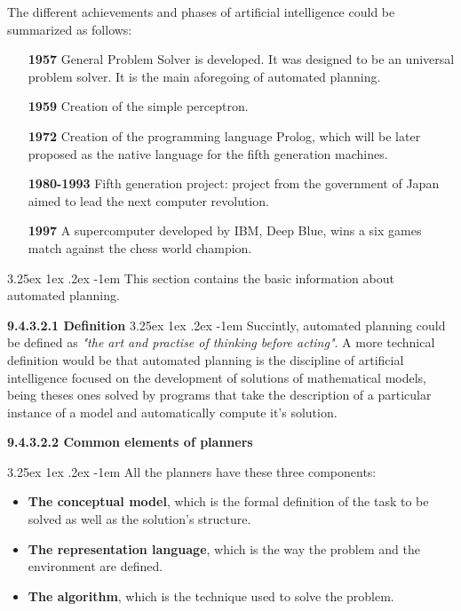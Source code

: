 \documentclass{article}
\makeatletter
\newcounter{subsubsubsection}
\renewcommand\paragraph{\@startsection{paragraph}{5}{\z@}%
      {3.25ex \@plus1ex \@minus.2ex}%
      {-1em}%
      {\normalfont\normalsize\bfseries}}
\makeatother
\begin{document}
    The different achievements and phases of artificial intelligence could be summarized as follows:
    
    \begin{itemize}
        \item[\textbf{1957}] General Problem Solver is developed. It was designed to be an universal problem solver. It is the main aforegoing of automated planning.
        \item[\textbf{1959}] Creation of the simple perceptron.
        \item[\textbf{1972}] Creation of the programming language Prolog, which will be later proposed as the native language for the fifth generation machines.
        \item[\textbf{1980-1993}] Fifth generation project: project from the government of Japan aimed to lead the next computer revolution.
        \item[\textbf{1997}] A supercomputer developed by IBM, Deep Blue, wins a six games match against the chess world champion.
    \end{itemize}
    
    
    \paragraph{}
    This section contains the basic information about automated planning.
    
    \textbf{9.4.3.2.1 Definition}
    \paragraph{}
    Succintly, automated planning could be defined as \textit{"the art and practise of thinking before acting"}. A more technical definition would be that automated planning is the discipline of artificial intelligence focused on the development of solutions of mathematical models, being theses ones solved by programs that take the description of a particular instance of a model and automatically compute it's solution.
    
    \textbf{9.4.3.2.2 Common elements of planners}
    
    \paragraph{}
    All the planners have these three components:
    \begin{itemize}
        \item \textbf{The conceptual model}, which is the formal definition of the task to be solved as well as the solution's structure.
        \item \textbf{The representation language}, which is the way the problem and the environment are defined.
        \item \textbf{The algorithm}, which is the technique used to solve the problem.
    \end{itemize}
    
\end{document}
